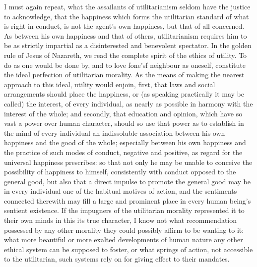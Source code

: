 I must again repeat, what the assailants of utilitarianism seldom have
the justice to acknowledge, that the happiness which forms the
utilitarian standard of what is right in conduct, is not the agent's
own happiness, but that of all concerned. As between his own happiness
and that of others, utilitarianism requires him to be as strictly
impartial as a disinterested and benevolent spectator. In the golden
rule of Jesus of Nazareth, we read the complete spirit of the ethics
 of utility. To do as one would be done by, and to love
fone'sf neighbour as oneself, constitute the ideal perfection of
utilitarian morality. As the means of making the nearest approach to
this ideal, utility would enjoin, first, that laws and social
arrangements should place the happiness, or (as speaking practically
it may be called) the interest, of every individual, as nearly as
possible in harmony with the interest of the whole; and secondly, that
education and opinion, which have so vast a power over human
character, should so use that power as to establish in the mind of
every individual an indissoluble association between his own happiness
and the good of the whole; especially between his own happiness and
the practice of such modes of conduct, negative and positive, as
regard for the universal happiness prescribes: so that not only he may
be unable to conceive the possibility of happiness to himself,
consistently with conduct opposed to the general good, but also that a
direct impulse to promote the general good may be in every individual
one of the habitual motives of action, and the sentiments connected
therewith may fill a large and prominent place in every human being's
sentient existence. If the impugners of the utilitarian morality
represented it to their own minds in this its true character, I know
not what recommendation possessed by any other morality they could
possibly affirm to be wanting to it: what more beautiful or more
exalted developments of human nature any other ethical system can be
supposed to foster, or what springs of action, not accessible to the
utilitarian, such systems rely on for giving effect to their
mandates.

